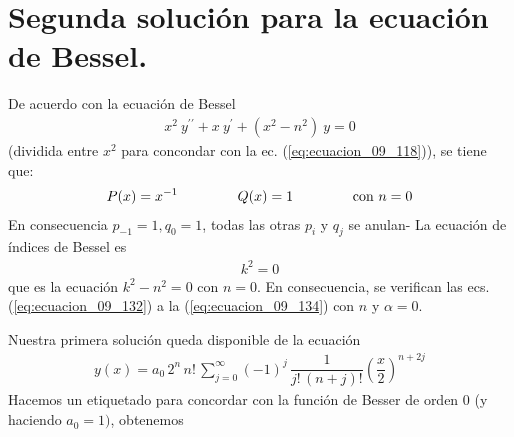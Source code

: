 \section{Segunda solución para la ecuación de Bessel.}

De acuerdo con la ecuación de Bessel 
\begin{align}
x^{2} \: y^{\prime \prime} + x \: y^{\prime} + (x^{2} - n^{2}) \: y = 0
\label{eq:ecuacion_09_100}
\end{align}
(dividida entre $x^{2}$ para concondar con la ec. (\ref{eq:ecuacion_09_118})), se tiene que:
\begin{align*}
P(x) = x^{-1} \hspace{1.5cm} Q(x) = 1 \hspace{1.5cm} \text{con } n = 0
\end{align*}
En consecuencia $p_{-1} = 1, q_{0} = 1$, todas las otras $p_{i}$ y $q_{j}$ se anulan- La ecuación de índices de Bessel es
\begin{align*}
k^{2} = 0
\end{align*}
que es la ecuación $k^{2} - n^{2} = 0$ con $n = 0$. En consecuencia, se verifican las ecs. (\ref{eq:ecuacion_09_132}) a la (\ref{eq:ecuacion_09_134}) con $n$ y $\alpha = 0$.
\par
Nuestra primera solución queda disponible de la ecuación
\begin{align}
y(x) = a_{0} \, 2^{n} \, n! \, \sum_{j=0}^{\infty} (-1)^{j} \, \dfrac{1}{j! \, (n + j)!} \left( \dfrac{x}{2} \right)^{n +2j}
\label{eq:ecuacion_09_108}
\end{align}
Hacemos un etiquetado para concordar con la función de Besser de orden $0$ (y haciendo $a_{0} = 1)$, obtenemos
